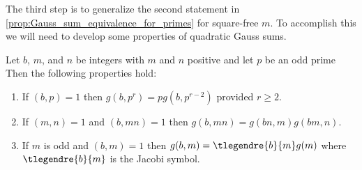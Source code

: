 \documentclass[12pt]{article}
\begin{document}
      The third step is to generalize the second statement in \cref{prop:Gauss_sum_equivalence_for_primes} for square-free \(m\). To accomplish this we will need to develop some properties of quadratic Gauss sums.

      \begin{proposition}\label{prop:quadratic_Gauss_sum_reduction}
        Let \(b\), \(m\), and \(n\) be integers with \(m\) and \(n\) positive and let \(p\) be an odd prime Then the following properties hold:
        \begin{enumerate}[label*=(\roman*)]
          \item If \((b,p) = 1\) then \(g(b,p^{r}) = pg(b,p^{r-2})\) provided \(r \ge 2\).
          \item If \((m,n) = 1\) and \((b,mn) = 1\) then \(g(b,mn) = g(bn,m)g(bm,n)\).
          \item If \(m\) is odd and \((b,m) = 1\) then \(g(b,m) = \tlegendre{b}{m}g(m)\) where \(\tlegendre{b}{m}\) is the Jacobi symbol.
        \end{enumerate}
      \end{proposition}
\end{document}
